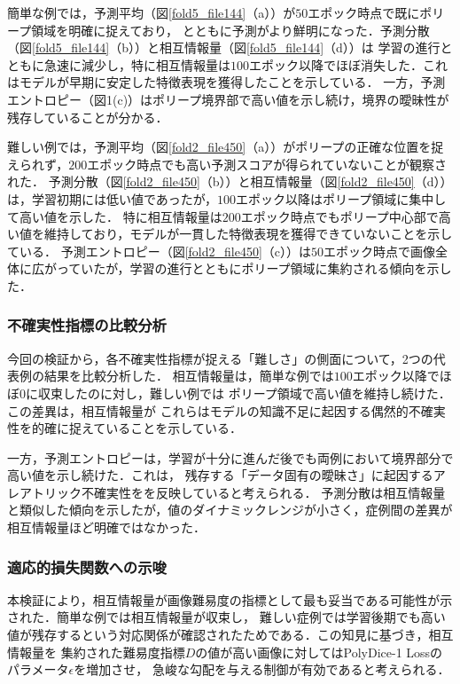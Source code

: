 \documentclass[10pt, a4paper, twocolumn]{jarticle}
\begin{document}
簡単な例では，予測平均（図\ref{fold5_file144}（a））が$50$エポック時点で既にポリープ領域を明確に捉えており，
とともに予測がより鮮明になった．予測分散（図\ref{fold5_file144}（b））と相互情報量（図\ref{fold5_file144}（d））は
学習の進行とともに急速に減少し，特に相互情報量は$100$エポック以降でほぼ消失した．これはモデルが早期に安定した特徴表現を獲得したことを示している．
一方，予測エントロピー（図1(c)）はポリープ境界部で高い値を示し続け，境界の曖昧性が残存していることが分かる．

難しい例では，予測平均（図\ref{fold2_file450}（a））がポリープの正確な位置を捉えられず，$200$エポック時点でも高い予測スコアが得られていないことが観察された．
予測分散（図\ref{fold2_file450}（b））と相互情報量（図\ref{fold2_file450}（d））は，学習初期には低い値であったが，$100$エポック以降はポリープ領域に集中して高い値を示した．
特に相互情報量は$200$エポック時点でもポリープ中心部で高い値を維持しており，モデルが一貫した特徴表現を獲得できていないことを示している．
予測エントロピー（図\ref{fold2_file450}（c））は$50$エポック時点で画像全体に広がっていたが，学習の進行とともにポリープ領域に集約される傾向を示した．

\subsubsection{不確実性指標の比較分析}

今回の検証から，各不確実性指標が捉える「難しさ」の側面について，2つの代表例の結果を比較分析した．
相互情報量は，簡単な例では$100$エポック以降でほぼ$0$に収束したのに対し，難しい例では
ポリープ領域で高い値を維持し続けた．この差異は，相互情報量が
これらはモデルの知識不足に起因する偶然的不確実性を的確に捉えていることを示している．

一方，予測エントロピーは，学習が十分に進んだ後でも両例において境界部分で高い値を示し続けた．これは，
残存する「データ固有の曖昧さ」に起因するアレアトリック不確実性をを反映していると考えられる．
予測分散は相互情報量と類似した傾向を示したが，値のダイナミックレンジが小さく，症例間の差異が相互情報量ほど明確ではなかった．

\subsubsection{適応的損失関数への示唆}
本検証により，相互情報量が画像難易度の指標として最も妥当である可能性が示された．簡単な例では相互情報量が収束し，
難しい症例では学習後期でも高い値が残存するという対応関係が確認されたためである．この知見に基づき，相互情報量を
集約された難易度指標$D$の値が高い画像に対してはPolyDice-1 Lossのパラメータ$\epsilon$を増加させ，
急峻な勾配を与える制御が有効であると考えられる．
\end{document}
